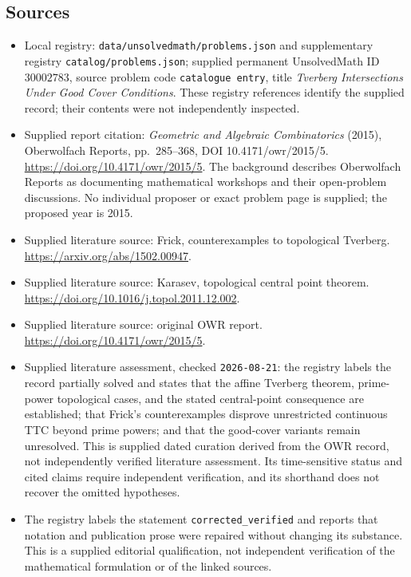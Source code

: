 \documentclass[11pt]{article}
\begin{document}
\subsection{Sources}
\begin{itemize}
\item Local registry: \texttt{data/unsolvedmath/problems.json} and supplementary registry \texttt{catalog/problems.json}; supplied permanent UnsolvedMath ID \(30002783\), source problem code \texttt{catalogue entry}, title \emph{Tverberg Intersections Under Good Cover Conditions}. These registry references identify the supplied record; their contents were not independently inspected.
\item Supplied report citation: \emph{Geometric and Algebraic Combinatorics} (2015), Oberwolfach Reports, pp.\ 285--368, DOI 10.4171/owr/2015/5. \url{https://doi.org/10.4171/owr/2015/5}. The background describes Oberwolfach Reports as documenting mathematical workshops and their open-problem discussions. No individual proposer or exact problem page is supplied; the proposed year is 2015.
\item Supplied literature source: Frick, counterexamples to topological Tverberg. \url{https://arxiv.org/abs/1502.00947}.
\item Supplied literature source: Karasev, topological central point theorem. \url{https://doi.org/10.1016/j.topol.2011.12.002}.
\item Supplied literature source: original OWR report. \url{https://doi.org/10.4171/owr/2015/5}.
\item Supplied literature assessment, checked \texttt{2026-08-21}: the registry labels the record partially solved and states that the affine Tverberg theorem, prime-power topological cases, and the stated central-point consequence are established; that Frick's counterexamples disprove unrestricted continuous TTC beyond prime powers; and that the good-cover variants remain unresolved. This is supplied dated curation derived from the OWR record, not independently verified literature assessment. Its time-sensitive status and cited claims require independent verification, and its shorthand does not recover the omitted hypotheses.
\item The registry labels the statement \texttt{corrected\_verified} and reports that notation and publication prose were repaired without changing its substance. This is a supplied editorial qualification, not independent verification of the mathematical formulation or of the linked sources.
\end{itemize}
\end{document}
